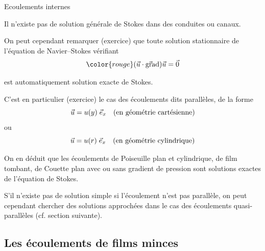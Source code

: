\begin{frame}{Ecoulements internes}

\small

Il n'existe pas de solution générale de Stokes dans des conduites ou canaux.

\medskip \pause

On peut cependant remarquer (exercice) que toute solution stationnaire de l'équation de Navier--Stokes vérifiant 
\[
	\color{rouge}
	(\myvec{u} \cdot \gradient) \myvec{u} = \myvec{0}
\]

est automatiquement solution exacte de Stokes.

\pause
\bigskip

C'est en particulier (exercice) le cas des écoulements dits \textcolor{vert}{parallèles},
de la forme
\[
	\vec{u} = u(y)\; \vec{e}_{x} \quad \mbox{(en géométrie cartésienne)}
\]
ou 
\[
	\vec{u} = u(r)\; \vec{e}_{x}  \quad \mbox{(en géométrie cylindrique)}
\]

\medskip
On en déduit que les écoulements de Poiseuille plan et cylindrique, de film
tombant, de Couette plan avec ou sans gradient de pression sont solutions exactes de l'équation de Stokes.

\medskip
\pause

S'il n'existe pas de solution simple si l'écoulement n'est pas parallèle, on peut cependant chercher des solutions approchées dans le cas des écoulements 
\textcolor{vert}{quasi-parallèles} (cf. section suivante).


\vspace{15mm}

\end{frame}

\subsection{Les écoulements de films minces}

